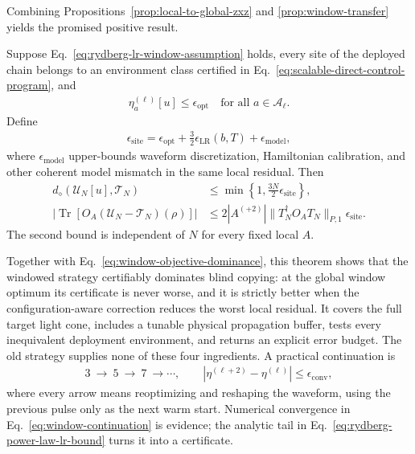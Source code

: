 Combining Propositions~\ref{prop:local-to-global-zxz} and
\ref{prop:window-transfer} yields the promised positive result.

\begin{theorem}
\label{thm:certified-small-window-deployment}
Suppose Eq.~\eqref{eq:rydberg-lr-window-assumption} holds, every site of the
deployed chain belongs to an environment class certified in
Eq.~\eqref{eq:scalable-direct-control-program}, and
\begin{align}
\eta_a^{(\ell)}[u]\leq\epsilon_{\mathrm{opt}}
\quad\text{for all }a\in\mathcal A_\ell.
\end{align}
Define
\begin{align}
\epsilon_{\mathrm{site}}
=\epsilon_{\mathrm{opt}}
+\frac{3}{2}\epsilon_{\mathrm{LR}}(b,T)
+\epsilon_{\mathrm{model}},
\label{eq:certified-site-error}
\end{align}
where $\epsilon_{\mathrm{model}}$ upper-bounds waveform discretization,
Hamiltonian calibration, and other coherent model mismatch in the same local
residual.  Then
\begin{align}
d_\diamond(\mathcal U_N[u],\mathcal T_N)
&\leq\min\left\{1,\frac{3N}{2}\epsilon_{\mathrm{site}}\right\},
\label{eq:certified-global-deployment}\\
\left|\operatorname{Tr}\left[O_A
(\mathcal U_N-\mathcal T_N)(\rho)\right]\right|
&\leq
2|A^{(+2)}|\|T_N^\dagger O_AT_N\|_{P,1}
\epsilon_{\mathrm{site}}.
\label{eq:certified-local-deployment}
\end{align}
The second bound is independent of $N$ for every fixed local $A$.
\end{theorem}

Together with Eq.~\eqref{eq:window-objective-dominance}, this theorem shows
that the windowed strategy certifiably dominates blind copying: at the global
window optimum its certificate is never worse, and it is strictly better when
the configuration-aware correction reduces the worst local residual.  It
covers the full target light cone, includes a tunable physical propagation
buffer, tests every inequivalent deployment environment, and returns an
explicit error budget.  The old strategy supplies none of these four
ingredients.  A practical continuation is
\begin{align}
3\ \longrightarrow\ 5\ \longrightarrow\ 7\ \longrightarrow\cdots,
\qquad
|\eta^{(\ell+2)}-\eta^{(\ell)}|\leq\epsilon_{\mathrm{conv}},
\label{eq:window-continuation}
\end{align}
where every arrow means reoptimizing and reshaping the waveform, using the
previous pulse only as the next warm start.  Numerical convergence in
Eq.~\eqref{eq:window-continuation} is evidence; the analytic tail in
Eq.~\eqref{eq:rydberg-power-law-lr-bound} turns it into a certificate.

